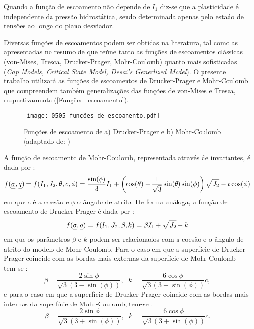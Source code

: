 Quando a função de escoamento não depende de $I_1$   diz-se que a plasticidade é independente da pressão hidrostática, sendo determinada apenas pelo estado de tensões ao longo do plano desviador.

Diversas funções de escoamentos podem ser obtidas na literatura, tal como as apresentadas no resumo de  que reúne tanto as funções de escoamentos clássicas (von-Mises, Tresca, Drucker-Prager, Mohr-Coulomb) quanto mais sofisticadas (\textit{Cap Models, Critical State Model, Desai’s Generlized Model}). O presente trabalho utilizará as funções de escoamentos de Drucker-Prager e Mohr-Coulomb que compreendem também generalizações das funções de von-Mises e Tresca, respectivamente (\autoref{Funções_escoamento}).
\begin{figure}[H]
	\begin{center}
		\texttt{[image: 0505-funções de escoamento.pdf]}
	\end{center}
	\caption{\label{Funções_escoamento}Funções de escoamento de a) Drucker-Prager e b) Mohr-Coulomb  (adaptado de: )}
\end{figure}
A função de escoamento de Mohr-Coulomb, representada através de invariantes, é dada por \cite[p. 166]{Neto2008}:
\begin{equation}
	\label{eq:f_Mohr_Coulomb}
	f(\underline{\underline \sigma},\underline q) = f(I_1,J_2,\theta,c,\phi) = \dfrac{\sin(\phi)}{3}I_1 + \left(\cos(\theta)-\dfrac{1}{\sqrt{3}}\sin(\theta)\sin(\phi)\right)\sqrt{J_2}-c\cos(\phi) 
\end{equation}
em que $c$ é a coesão e $\phi$ o ângulo de atrito. De forma análoga, a função de escoamento de Drucker-Prager é dada por \cite[p. 167]{Neto2008}:
\begin{equation}
	\label{eq:f_Drucker_Prager}
	f(\underline{\underline \sigma},\underline q) = f(I_1,J_2,\beta,k) = \beta I_1 +\sqrt{J_2}-k
\end{equation}
em que os parâmetros $\beta$ e $k$ podem ser relacionados com a coesão e o ângulo de atrito do modelo de Mohr-Coulomb. Para o caso em que a superfície de Drucker-Prager coincide com as bordas mais externas da superfície de Mohr-Coulomb tem-se \cite[p. 167]{Neto2008}:
\begin{equation}
	\label{eq:f_DP_bordasexternas_MC}
	\beta = \dfrac{2\sin{\phi}}{\sqrt{3}(3-\sin(\phi))}, ~~~ k = \dfrac{6\cos{\phi}}{\sqrt{3}(3-\sin(\phi))}c,
\end{equation}
e para o caso em que a superfície de Drucker-Prager coincide com as bordas mais internas da superfície de Mohr-Coulomb, tem-se \cite[p. 167]{Neto2008}:
\begin{equation}
	\label{eq:f_DP_bordasinternas_MC}
	\beta = \dfrac{2\sin{\phi}}{\sqrt{3}(3+\sin(\phi))}, ~~~ k = \dfrac{6\cos{\phi}}{\sqrt{3}(3+\sin(\phi))}c.
\end{equation}

